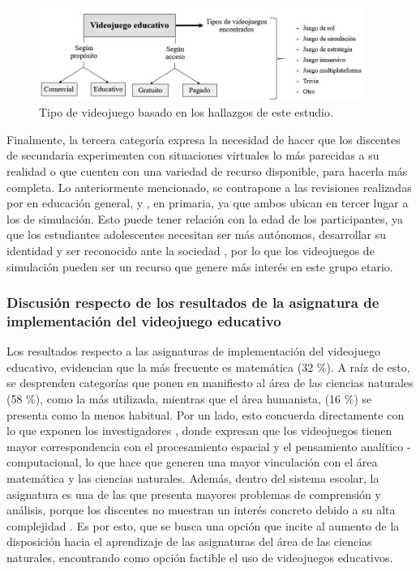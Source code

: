 \documentclass[spanish]{textolivre}
\begin{document}
\begin{figure}[htbp]
 \centering
 \includegraphics[width=0.95\textwidth]{Fig4.jpg}
 \caption{Tipo de videojuego basado en los hallazgos de este estudio.}
 \label{fig04}
\end{figure}

Finalmente, la tercera categoría expresa la necesidad de hacer que los discentes de secundaria experimenten con situaciones virtuales lo más parecidas a su realidad o que cuenten con una variedad de recurso disponible, para hacerla más completa. Lo anteriormente mencionado, se contrapone a las revisiones realizadas por \textcite{sousa_videogames_2018} en educación general, y \textcite{mendez_uso_2021}, en primaria, ya que ambos ubican en tercer lugar a los de simulación. Esto puede tener relación con la edad de los participantes, ya que los estudiantes adolescentes necesitan ser más autónomos, desarrollar su identidad y ser reconocido ante la sociedad \cite{miranda_redes_2018}, por lo que los videojuegos de simulación pueden ser un recurso que genere más interés en este grupo etario.


\subsubsection{Discusión respecto de los resultados de la asignatura de implementación del videojuego educativo}\label{sec-quotesandfootnotes}
Los resultados respecto a las asignaturas de implementación del videojuego educativo, evidencian que la más frecuente es matemática (32 \%). A raíz de esto, se desprenden categorías que ponen en manifiesto al área de las ciencias naturales (58 \%), como la más utilizada, mientras que el área humanista, (16 \%) se presenta como la menos habitual. Por un lado, esto concuerda directamente con lo que exponen los investigadores \textcite{torres-toukoumidis_desarrollo_2016,mendez_uso_2021}, donde expresan que los videojuegos tienen mayor correspondencia con el procesamiento espacial y el pensamiento analítico - computacional, lo que hace que generen una mayor vinculación con el área matemática y las ciencias naturales.  Además, dentro del sistema escolar, la asignatura es una de las que presenta mayores problemas de comprensión y análisis, porque los discentes no muestran un interés concreto debido a su alta complejidad \cite{maraza_quispe_efectos_2018}. Es por esto, que se busca una opción que incite al aumento de la disposición hacia el aprendizaje de las asignaturas del área de las ciencias naturales, encontrando como opción factible el uso de videojuegos educativos. 
\end{document}
